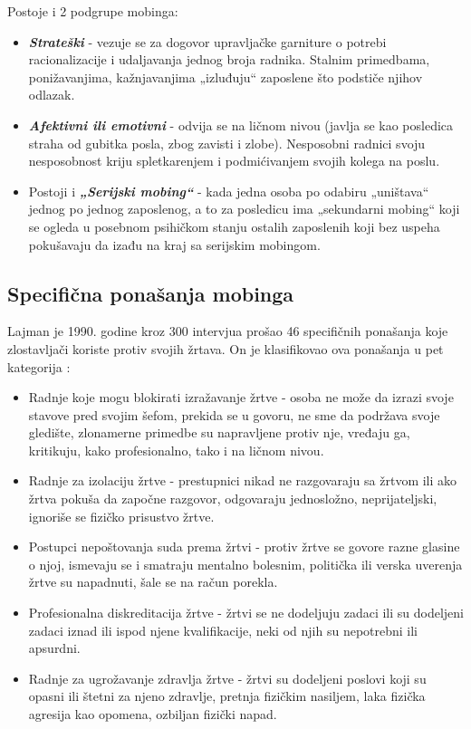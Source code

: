 \documentclass[a4paper]{article}
\newcommand{\quotes}[1]{„#1“}
\begin{document}
        Postoje i 2 podgrupe mobinga:
        \begin{itemize}
            \item \textbf{\textit{Strateški}} - vezuje se za dogovor upravljačke garniture o potrebi racionalizacije i udaljavanja jednog broja radnika. Stalnim primedbama, ponižavanjima, kažnjavanjima \quotes{izluđuju} zaposlene što podstiče njihov odlazak.
            \item \textbf{\textit{Afektivni ili emotivni}} - odvija se na ličnom nivou (javlja se kao posledica straha od gubitka posla, zbog zavisti i zlobe). Nesposobni radnici svoju nesposobnost kriju spletkarenjem i podmićivanjem svojih kolega na poslu.
            \item Postoji i \textbf{\textit{\quotes{Serijski mobing}}} - kada jedna osoba po odabiru \quotes{uništava} jednog po jednog zaposlenog, a to za posledicu ima \quotes{sekundarni mobing} koji se ogleda u posebnom psihičkom stanju ostalih zaposlenih koji bez uspeha pokušavaju da izađu na kraj sa serijskim mobingom.
        \end{itemize}
        
    \subsection{Specifična ponašanja mobinga}
        Lajman je 1990. godine kroz 300 intervjua prošao 46 specifičnih ponašanja koje zlostavljači koriste protiv svojih žrtava. On je klasifikovao ova ponašanja u pet kategorija \cite{CORNOIU2013708}:
        \begin{itemize}
            \item Radnje koje mogu blokirati izražavanje žrtve - osoba ne može da izrazi svoje stavove pred svojim šefom, prekida se u govoru, ne sme da podržava svoje gledište, zlonamerne primedbe su napravljene protiv nje, vređaju ga, kritikuju, kako profesionalno, tako i na ličnom nivou.
            \item Radnje za izolaciju žrtve - prestupnici nikad ne razgovaraju sa žrtvom ili ako žrtva pokuša da započne razgovor, odgovaraju jednosložno, neprijateljski, ignoriše se fizičko prisustvo žrtve.
            \item Postupci nepoštovanja suda prema žrtvi - protiv žrtve se govore razne glasine o njoj, ismevaju se i smatraju mentalno bolesnim, politička ili verska uverenja žrtve su napadnuti, šale se na račun porekla.
            \item Profesionalna diskreditacija žrtve - žrtvi se ne dodeljuju zadaci ili su dodeljeni zadaci iznad ili ispod njene kvalifikacije, neki od njih su nepotrebni ili apsurdni.
            \item Radnje za ugrožavanje zdravlja žrtve - žrtvi su dodeljeni poslovi koji su opasni ili štetni za njeno zdravlje, pretnja fizičkim nasiljem, laka fizička agresija kao opomena, ozbiljan fizički napad.
        \end{itemize}
        
\end{document}
